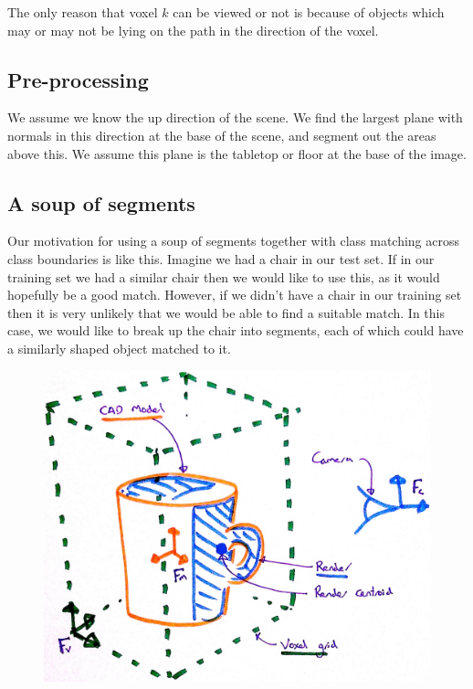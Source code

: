 \documentclass[10pt,a4paper, twocolumn]{article}
\begin{document}
The only reason that voxel $k$ can be viewed or not is because of objects which may or may not be lying on the path in the direction of the voxel.


\subsection{Pre-processing}
We assume we know the up direction of the scene.
We find the largest plane with normals in this direction at the base of the scene, and segment out the areas above this.
We assume this plane is the tabletop or floor at the base of the image.


\subsection{A soup of segments}

Our motivation for using a soup of segments together with class matching across class boundaries is like this.
Imagine we had a chair in our test set.
If in our training set we had a similar chair then we would like to use this, as it would hopefully be a good match.
However, if we didn't have a chair in our training set then it is very unlikely that we would be able to find a suitable match.
In this case, we would like to break up the chair into segments, each of which could have a similarly shaped object matched to it.


\begin{figure}
	\centering%
	\includegraphics[width=1.0\linewidth]{voxel_coordinates}%
	\label{fig:voxel_coordinates}%
\end{figure}
\end{document}
